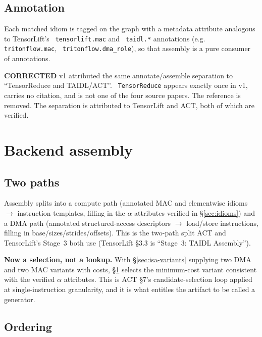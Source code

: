 \documentclass[11pt,a4paper]{article}
\newcommand{\code}[1]{\texttt{\small\hyphenchar\font=45 #1}}
\newcommand{\falsified}{\textbf{\textcolor{red!75!black}{CORRECTED}}}
\begin{document}
\subsection{Annotation}

Each matched idiom is tagged on the graph with a metadata attribute analogous to TensorLift's
\code{tensorlift.mac} and \code{taidl.*} annotations (e.g.\ \code{tritonflow.mac},
\code{tritonflow.dma\_role}), so that assembly is a pure consumer of annotations.

\noindent\falsified{} v1 attributed the same annotate/assemble separation to ``TensorReduce and TAIDL/ACT''.
\code{TensorReduce} appears exactly once in v1, carries no citation, and is not one of the four source
papers. The reference is removed. The separation is attributed to TensorLift and ACT, both of which are
verified.

\section{Backend assembly}\label{sec:assembly}

\subsection{Two paths}

Assembly splits into a compute path (annotated MAC and elementwise idioms $\rightarrow$ instruction
templates, filling in the $\alpha$ attributes verified in \S\ref{sec:idioms}) and a DMA path (annotated
structured-access descriptors $\rightarrow$ load/store instructions, filling in base/sizes/strides/offsets).
This is the two-path split ACT and TensorLift's Stage~3 both use (TensorLift \S3.3 is ``Stage~3: TAIDL
Assembly'').

\noindent\textbf{Now a selection, not a lookup.} With \S\ref{sec:isa-variants} supplying two DMA and two MAC
variants with costs, \S\ref{sec:assembly} selects the minimum-cost variant consistent with the verified
$\alpha$ attributes. This is ACT \S7's candidate-selection loop applied at single-instruction granularity,
and it is what entitles the artifact to be called a generator.

\subsection{Ordering}
\end{document}
